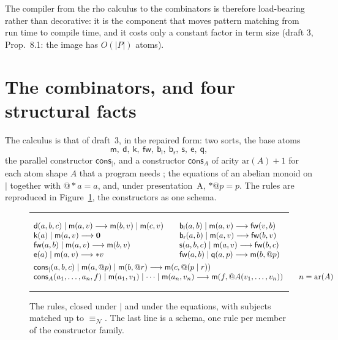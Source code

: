 \documentclass[11pt,a4paper]{article}
\makeatletter
\theoremstyle{plain}
\theoremstyle{definition}
\theoremstyle{remark}
\newcommand{\rhoc}{\textsf{rho}}
\newcommand{\quo}[1]{@#1}
\newcommand{\drp}[1]{{*}#1}
\newcommand{\nil}{\mathbf{0}}
\newcommand{\red}{\longrightarrow}
\newcommand{\nequiv}{\equiv_{\mathcal{N}}}
\newcommand{\mm}{\mathsf{m}}
\newcommand{\dd}{\mathsf{d}}
\newcommand{\kk}{\mathsf{k}}
\newcommand{\fw}{\mathsf{fw}}
\newcommand{\bl}{\mathsf{b}_{\mathsf{l}}}
\newcommand{\br}{\mathsf{b}_{\mathsf{r}}}
\newcommand{\sy}{\mathsf{s}}
\newcommand{\ev}{\mathsf{e}}
\newcommand{\qq}{\mathsf{q}}
\newcommand{\cons}{\mathsf{cons}}
\newcommand{\consp}{\mathsf{cons}_{\mid}}
\makeatother
\begin{document}
The compiler from the \rhoc{} calculus to the combinators is therefore
load-bearing rather than decorative: it is the component that moves pattern
matching from run time to compile time, and it costs only a constant factor in
term size (draft 3, Prop.~8.1: the image has $O(|P|)$ atoms).

\section{The combinators, and four structural facts}
\label{sec:facts}

The calculus is that of draft~3, in the repaired form: two sorts, the base
atoms
\[
\mm,\ \dd,\ \kk,\ \fw,\ \bl,\ \br,\ \sy,\ \ev,\ \qq,
\]
the parallel constructor $\consp$, and a constructor $\cons_{A}$ of arity
$\mathrm{ar}(A)+1$ for each atom shape $A$ that a program needs
\cite[Def.~3.8]{rhocomb3}; the equations of an abelian monoid on $\mid$
together with $\quo{\drp{a}} = a$, and, under presentation~A,
$\drp{\quo{p}} = p$. The rules are reproduced in Figure~\ref{fig:rules}, the
constructors as one schema.

\begin{figure}[t]
\hrule\vspace{4pt}
\[
\begin{array}{l@{\qquad}l}
 \dd(a,b,c) \mid \mm(a,v) \red \mm(b,v) \mid \mm(c,v)
   & \bl(a,b) \mid \mm(a,v) \red \fw(v,b)\\
 \kk(a) \mid \mm(a,v) \red \nil
   & \br(a,b) \mid \mm(a,v) \red \fw(b,v)\\
 \fw(a,b) \mid \mm(a,v) \red \mm(b,v)
   & \sy(a,b,c) \mid \mm(a,v) \red \fw(b,c)\\
 \ev(a) \mid \mm(a,v) \red \drp{v}
   & \fw(a,b) \mid \qq(a,p) \red \mm(b,\quo{p})\\[4pt]
 \multicolumn{2}{l}{\consp(a,b,c) \mid \mm(a,\quo{p}) \mid \mm(b,\quo{r})
   \red \mm(c,\quo{(p \mid r)})}\\
 \multicolumn{2}{l}{\cons_{A}(a_{1},\dots,a_{n},f) \mid \mm(a_{1},v_{1})
   \mid \cdots \mid \mm(a_{n},v_{n})
   \red \mm(f,\quo{A(v_{1},\dots,v_{n})}) \qquad n = \mathrm{ar}(A)}
\end{array}
\]
\vspace{2pt}\hrule
\caption{The rules, closed under $\mid$ and under the equations, with
subjects matched up to $\nequiv$. The last line is a schema, one rule per
member of the constructor family.}
\label{fig:rules}
\end{figure}
\end{document}
